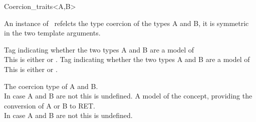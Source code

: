 \begin{ccRefClass}{Coercion_traits<A,B>}

\ccDefinition

An instance of \ccClassTemplateName\ refelcts the type coercion of the types
{\sc A} and {\sc B}, it is symmetric in the two template arguments. 


\ccTypes


        { Tag indicating whether the two types A and B are a model of  \\
          This is either  or . }
        { Tag indicating whether the two types A and B are a model of  \\
          This is either  or . }

        {The coercion type of {\sc A} and {\sc B}. \\
        In case A and B are not  this is undefined.  }
        {A model of the  concept, providing the conversion of {\sc A} or {\sc B} to {\sc RET}. \\
        In case A and B are not  this is undefined.  }


\ccSeeAlso
{} \\
\\
\end{ccRefClass} 